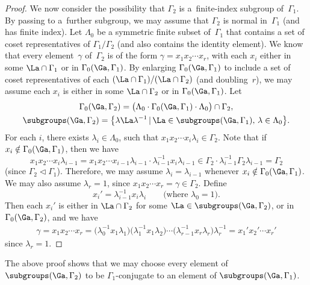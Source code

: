 \begin{proof}
We now consider the possibility that $\Gamma_2$ is a~finite-index subgroup of~$\Gamma_1$. By passing to a~further subgroup, we may assume that $\Gamma_2$ is normal in~$\Gamma_1$ (and has finite index).
Let $\Lambda_0$ be a symmetric finite subset of~$\Gamma_1$ that contains a set of coset representatives of $\Gamma_1/\Gamma_2$ (and also contains the identity element). We know that every element~$\gamma$ of~$\Gamma_2$ is of the form $\gamma = x_1 x_2 \cdots x_r$, with each $x_i$ either in some $\La \cap \Gamma_1$ or in $\Gamma_0(\Ga,\Gamma_1)$. By enlarging $\Gamma_0(\Ga,\Gamma_1)$ to include a set of coset representatives of each $(\La \cap \Gamma_1)/(\La \cap \Gamma_2)$ (and doubling~$r$), we may assume each $x_i$ is either in some $\La \cap \Gamma_2$ or in $\Gamma_0(\Ga,\Gamma_1)$.
Let
\begin{gather*}
\Gamma_0(\Ga,\Gamma_2) = \bigl( \Lambda_0 \cdot \Gamma_0(\Ga,\Gamma_1) \cdot \Lambda_0 \bigr) \cap \Gamma_2,\\
\subgroups(\Ga,\Gamma_2) = \big\{ \lambda \La \lambda^{-1} \,|\, \La \in \subgroups(\Ga,\Gamma_1), \, \lambda \in \Lambda_0 \big\} .
\end{gather*}
For each $i$, there exists $\lambda_i \in \Lambda_0$, such that $x_1 x_2 \cdots x_i \lambda_i \in \Gamma_2$. Note that if $x_i \notin \Gamma_0(\Ga,\Gamma_1)$, then we have
	\[ x_1 x_2 \cdots x_i \lambda_{i-1}
	= x_1 x_2 \cdots x_{i-1} \lambda_{i-1} \cdot \lambda_{i-1}^{-1} x_i \lambda_{i-1}
	\in \Gamma_2 \cdot \lambda_{i-1}^{-1} \Gamma_2 \lambda_{i-1}
	= \Gamma_2
	\]
(since $\Gamma_2 \triangleleft \Gamma_1$). Therefore, we may assume $\lambda_i = \lambda_{i-1}$ whenever $x_i \notin \Gamma_0(\Ga,\Gamma_1)$. We may also assume $\lambda_r = 1$, since $x_1 x_2 \cdots x_r = \gamma \in \Gamma_2$.
Define
	\[ x_i' = \lambda_{i-1}^{-1} x_i \lambda_i
	\qquad \text{(where $\lambda_0 = 1$)} .\]
Then each $x_i'$ is either in $\La \cap \Gamma_2$ for some $\La \in \subgroups(\Ga,\Gamma_2)$, or in $\Gamma_0(\Ga,\Gamma_2)$,
	and we have
		\begin{gather*}
		\gamma
		 = x_1 x_2 \cdots x_r
		= \big(\lambda_0^{-1} x_1 \lambda_1\big) \big(\lambda_1^{-1} x_1 \lambda_2\big)
		\cdots \big(\lambda_{r-1}^{-1} x_r \lambda_r\big) \lambda_r^{-1}
		= x_1' x_2' \cdots x_r'
		 \end{gather*}
since $\lambda_r = 1$.
\end{proof}

\begin{rem}The above proof shows that we may choose every element of $\subgroups(\Ga,\Gamma_2)$ to be $\Gamma_1$-conjugate to an element of $\subgroups(\Ga,\Gamma_1)$.
\end{rem}

